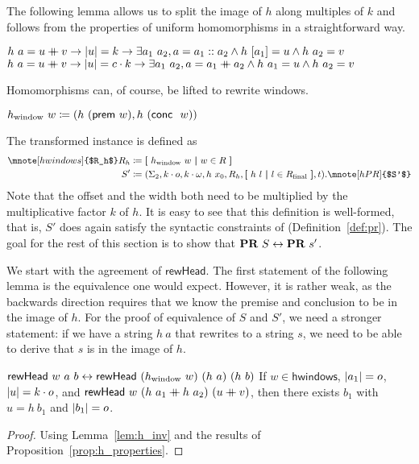 The following lemma allows us to split the image of $h$ along multiples of $k$ and follows from the properties of uniform homomorphisms in a straightforward way.
\begin{lemma}[Inversion of $h$]\label{lem:h_inv}\leavevmode
  \begin{enumerate}
     $h~a = u \mathbin{+\mkern-10mu+} v \rightarrow |u| = k \rightarrow \exists a_1~a_2, a = a_1 :: a_2 \land h~[a_1] = u \land h~a_2 = v$
     $h~a = u \mathbin{+\mkern-10mu+} v \rightarrow |u| = c \cdot k \rightarrow \exists a_1~a_2, a = a_1 \mathbin{+\mkern-10mu+} a_2 \land h~a_1 = u \land h~a_2 = v$ 
  \end{enumerate}
\end{lemma}

Homomorphisms can, of course, be lifted to rewrite windows. 
\begin{definition}
  $h_\text{window}~w\coloneqq (h~(\textsf{prem}~w), h~(\textsf{conc}~~w)) $
\end{definition}
The transformed \PR{} instance is defined as
\begin{align*}
  \mnote[hwindows]{$R_h$}
  R_h &\defeq \withl h_\text{window}~w \withm w \in R \withr \\
  S' &\defeq (\Sigma_2, k \cdot o, k \cdot \omega, h~x_0, R_h, \withl h~l \withm l \in \Rfinal \withr, t).
  \mnote[hPR]{$S'$}
\end{align*}
Note that the offset and the width both need to be multiplied by the multiplicative factor $k$ of $h$.
It is easy to see that this definition is well-formed, that is, $S'$ does again satisfy the syntactic constraints of \PR{} (Definition~\ref{def:pr}).
The goal for the rest of this section is to show that $\textbf{PR}{}~S \leftrightarrow \textbf{PR}{}~s'$. 

We start with the agreement of $\textsf{rewHead}$.
The first statement of the following lemma is the equivalence one would expect. However, it is rather weak, as the backwards direction requires that we know the premise and conclusion to be in the image of $h$.
For the proof of equivalence of $S$ and $S'$, we need a stronger statement: if we have a string $h~a$ that rewrites to a string $s$, we need to be able to derive that $s$ is in the image of $h$.

\begin{lemma}\label{lem:rewHead_agree}\leavevmode
  \begin{enumerate}
     $\textsf{rewHead}~w~a~b \leftrightarrow \textsf{rewHead}~(h_{\text{window}}~w)~(h~a)~(h~b)$
     If $w \in \textsf{hwindows}$, $|a_1| = o$, $|u| = k \cdot o$, and $\textsf{rewHead}~w~(h~a_1 \mathbin{+\mkern-10mu+} h~a_2)~(u \mathbin{+\mkern-10mu+} v)$, then there exists $b_1$ with $u = h~b_1$ and $|b_1| = o$.
  \end{enumerate}
\end{lemma}
\begin{proof}
  Using Lemma~\ref{lem:h_inv} and the results of Proposition~\ref{prop:h_properties}.
\end{proof}


